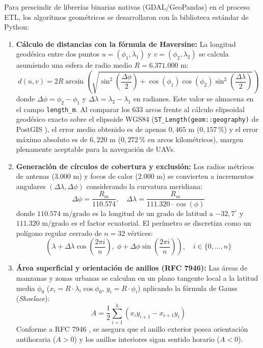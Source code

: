 \documentclass[letterpaper,12pt]{article}
\begin{document}
Para prescindir de librerías binarias nativas (GDAL/GeoPandas) en el proceso ETL, los algoritmos geométricos se desarrollaron con la biblioteca estándar de Python:
\begin{enumerate}
    \item \textbf{Cálculo de distancias con la fórmula de Haversine:} La longitud geodésica entre dos puntos $u=(\phi_1, \lambda_1)$ y $v=(\phi_2, \lambda_2)$ se calcula asumiendo una esfera de radio medio $R = 6.371.000\text{ m}$:
    \begin{equation}
        d(u,v) = 2 R \arcsin \left( \sqrt{\sin^2\left(\frac{\Delta \phi}{2}\right) + \cos(\phi_1)\cos(\phi_2)\sin^2\left(\frac{\Delta \lambda}{2}\right)} \right)
        \label{eq:haversine}
    \end{equation}
    donde $\Delta \phi = \phi_2 - \phi_1$ y $\Delta \lambda = \lambda_2 - \lambda_1$ en radianes. Este valor se almacena en el campo \texttt{length\_m}. Al comparar los $633$ arcos frente al cálculo elipsoidal geodésico exacto sobre el elipsoide WGS84 (\texttt{ST\_Length(geom::geography)} de PostGIS \cite{postgis}), el error medio obtenido es de apenas $0{,}465\text{ m}$ ($0{,}157$\,\%) y el error máximo absoluto es de $6{,}220\text{ m}$ ($0{,}272$\,\% en arcos kilométricos), margen plenamente aceptable para la navegación de UAVs.
    \item \textbf{Generación de círculos de cobertura y exclusión:} Los radios métricos de antenas ($3.000\text{ m}$) y focos de calor ($2.000\text{ m}$) se convierten a incrementos angulares $(\Delta \lambda, \Delta \phi)$ considerando la curvatura meridiana:
    \begin{equation}
        \Delta \phi = \frac{R_m}{110.574}, \quad \Delta \lambda = \frac{R_m}{111.320 \cdot \cos(\phi)}
    \end{equation}
    donde $110.574\text{ m/grado}$ es la longitud de un grado de latitud a $-32{,}7^\circ$ y $111.320\text{ m/grado}$ es el factor ecuatorial. El perímetro se discretiza como un polígono regular cerrado de $n=32$ vértices:
    \begin{equation}
        \left( \lambda + \Delta \lambda \cos\left(\frac{2\pi i}{n}\right), \; \phi + \Delta \phi \sin\left(\frac{2\pi i}{n}\right) \right), \quad i \in \{0, \dots, n\}
    \end{equation}
    \item \textbf{Área superficial y orientación de anillos (RFC 7946):} Las áreas de manzanas y zonas urbanas se calculan en un plano tangente local a la latitud media $\phi_0$ ($x_i = R \cdot \lambda_i \cos\phi_0$, $y_i = R \cdot \phi_i$) aplicando la fórmula de Gauss (\textit{Shoelace}):
    \begin{equation}
        A = \frac{1}{2} \sum_{i=1}^{k} (x_i y_{i+1} - x_{i+1} y_i)
    \end{equation}
    Conforme a RFC 7946 \cite{rfc7946}, se asegura que el anillo exterior posea orientación antihoraria ($A > 0$) y los anillos interiores sigan sentido horario ($A < 0$).
\end{enumerate}
\end{document}
